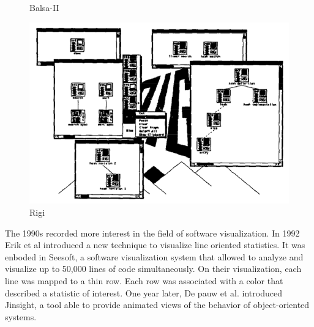 \begin{figure}[H]
    \caption{Balsa-II}
  \endminipage\hfill
  \includegraphics[width=\linewidth]{Mueller1988_Rigi.png}
  \caption{Rigi}
\endminipage\hfill
  \end{figure}




The 1990s recorded more interest in the field of software visualization. 
In 1992 Erik et al \cite{Eick1992} introduced a new technique to visualize line oriented statistics. 
It was enboded in Seesoft, a software visualization system that allowed to analyze and visualize up to 50,000 lines of code simultaneously. 
On their visualization, each line was mapped to a thin row. Each row was associated with a color that described a statistic of interest.
One year later, De pauw et al. \cite{DePauw1993} introduced Jinsight, a tool able to provide animated views of the behavior of object-oriented systems. 

